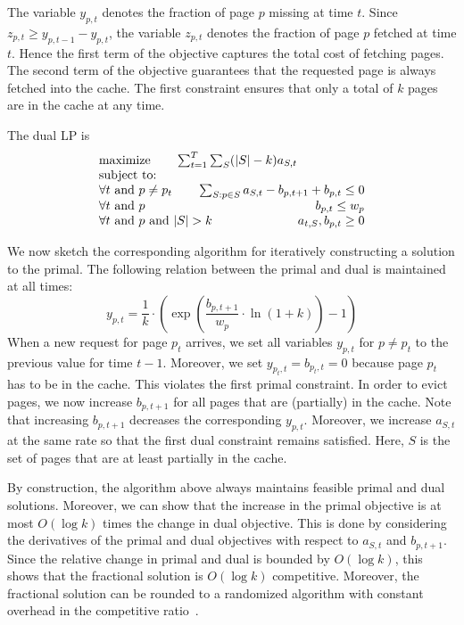 The variable $y_{p,t}$ denotes the fraction of page $p$ missing at time $t$.
Since $z_{p,t} \geq y_{p,t-1} - y_{p,t}$, the variable $z_{p,t}$ denotes the fraction of page $p$ fetched at time $t$.
Hence the first term of the objective captures the total cost of fetching pages.
The second term of the objective guarantees that the requested page is always fetched into the cache.
The first constraint ensures that only a total of $k$ pages are in the cache at any time.

The dual LP is
\[
\begin{array}{lr}
  \multicolumn{2}{l}{\textrm{maximize} \qquad  \sum_{t=1}^T\sum_S (|S| - k) a_{S,t}} \\
  \textrm{subject to:} & \\
  \multicolumn{2}{l}{\forall t \textrm{ and } p \neq p_t \qquad\sum_{S: p \in S} a_{S,t} - b_{p, t+1} + b_{p,t} \leq 0} \\
  \forall t \textrm{ and } p & b_{p,t} \leq w_p \\
  \forall t \textrm{ and } p \textrm{ and } |S| > k & a_{t,S}, b_{p,t} \geq 0 \\
\end{array}
\]

We now sketch the corresponding algorithm for iteratively constructing a solution to the primal.
The following relation between the primal and dual is maintained at all times:
\[
y_{p,t} = \frac{1}{k} \cdot \left( \exp \left( \frac{b_{p,t+1}}{w_p} \cdot \ln(1+k) \right) - 1 \right)
\]
When a new request for page $p_t$ arrives, we set all variables $y_{p,t}$ for $p \neq p_t$ to the previous value for time $t-1$.
Moreover, we set $y_{p_t, t} = b_{p_t, t} = 0$ because page $p_t$ has to be in the cache.
This violates the first primal constraint.
In order to evict pages, we now increase $b_{p, t+1}$ for all pages that are (partially) in the cache.
Note that increasing $b_{p, t+1}$ decreases the corresponding $y_{p,t}$.
Moreover, we increase $a_{S,t}$ at the same rate so that the first dual constraint remains satisfied.
Here, $S$ is the set of pages that are at least partially in the cache.

By construction, the algorithm above always maintains feasible primal and dual solutions.
Moreover, we can show that the increase in the primal objective is at most $O(\log k)$ times the change in dual objective.
This is done by considering the derivatives of the primal and dual objectives with respect to $a_{S,t}$ and $b_{p,t+1}$.
Since the relative change in primal and dual is bounded by $O(\log k)$, this shows that the fractional solution is $O(\log k)$ competitive.
Moreover, the fractional solution can be rounded to a randomized algorithm with constant overhead in the competitive ratio~\cite{bansal07:weighted-paging}.


